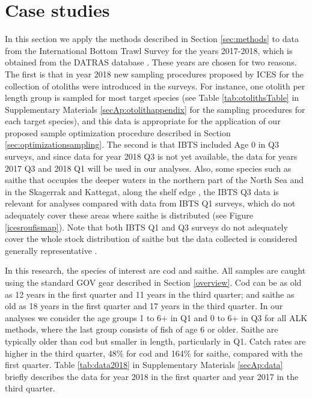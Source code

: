 \documentclass[a4paper 12pt]{article}
\numberwithin{equation}{section}
\begin{document}
\section{Case studies}
\label{sec:data}
In this section we apply the methods described in Section \ref{sec:methods} to data from the International Bottom Trawl Survey for the years 2017-2018, which is obtained from the DATRAS database \citep{datras}. These years are chosen for two reasons. The first is that in year 2018 new sampling procedures proposed by ICES for the collection of otoliths were introduced in the surveys. For instance, one otolith per length group is sampled for most target species (see Table \ref{tab:otolithsTable} in Supplementary Materials \ref{secAp:otolithappendix} for the sampling procedures for each target species), and this data is appropriate for the application of our proposed sample optimization procedure described in Section \ref{sec:optimizationsampling}. The second is that IBTS included Age 0 in Q3 surveys, and since data for year 2018 Q3 is not yet available, the data for years 2017 Q3 and 2018 Q1 will be used in our analyses. Also, some species such as saithe that occupies the deeper waters in the northern part of the North Sea and in the Skagerrak and Kattegat, along the shelf edge \citep{ICESFishMaps}, the IBTS Q3 data is relevant for analyses compared with data from IBTS Q1 surveys, which do not adequately cover these areas where saithe is distributed (see Figure \ref{icesroufismap}). Note that both IBTS Q1 and Q3 surveys do not adequately cover the whole stock distribution of saithe but the data collected is considered generally representative \citep{ICESJune2016}.

In this research, the species of interest are cod and saithe. All samples are caught using the standard GOV gear described in Section \ref{overview}.  Cod can be as old as 12 years in the first quarter and 11 years in the third quarter; and saithe as old as 18 years in the first quarter and 17 years in the third quarter. In our analyses we consider the age groups 1 to 6+ in Q1 and 0 to 6+ in Q3 for all ALK methods, where the last group consists of fish of age 6 or older. Saithe are typically older than cod but smaller in length, particularly in Q1. Catch rates are higher in the third quarter, 48\% for cod and 164\% for saithe, compared with the first quarter. Table \ref{tab:data2018} in Supplementary Materials \ref{secAp:data} briefly describes the data for year 2018 in the first quarter and year 2017 in the third quarter.
\end{document}
